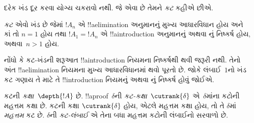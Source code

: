 \documentclass[../../../include/open-logic-section]{subfiles}
\begin{document}
દરેક ખંડ દૂર
કરવા યોગ્ય
ચકરાવો નથી.
જે એવા છે
તેમને \emph{કટ}
કહીએ છીએ.

\begin{defn}
\emph{કટ} એવો
ખંડ છે જેમાં
$!A_n$ એ
!!a{elimination}
અનુમાનનું મુખ્ય
આધારવિધાન હોય
અને કાં તો
$n=1$ હોય તથા
$!A_1 = !A_n$
એ !!a{introduction}
અનુમાનનું અથવા
\FalseInt{}નું
નિષ્કર્ષ હોય,
અથવા~$n>1$
હોય.
\end{defn}

નોંધો કે કટ-ખંડની
શરૂઆત !!a{introduction}
નિયમના નિષ્કર્ષથી
થવી જરૂરી નથી.
તેનો અંત
!!a{elimination}
નિયમના મુખ્ય
આધારવિધાનમાં
થવો પૂરતો છે.
જોકે લંબાઈ~$1$નો
ખંડ કટ ગણાય
તે માટે તે
!!{introduction}
નિયમનું અથવા
\FalseInt{}નું
નિષ્કર્ષ હોવું
જોઈએ.

\begin{defn}
કટની \emph{કક્ષા}~$\depth{!A}$
છે. !!a{proof}~$\delta$ની
\emph{કટ-કક્ષા}~$\cutrank{\delta}$
એ~$\delta$માંના
કટોની મહત્તમ
કક્ષા છે.
કટની કક્ષા
$\cutrank{\delta}$
હોય, એટલે
મહત્તમ કક્ષા
હોય, તો તે
$\delta$માં
\emph{મહત્તમ}
કટ છે.
$\delta$ની
\emph{કટ-લંબાઈ}
એ તેના બધા
મહત્તમ કટોની
લંબાઈનો સરવાળો
છે.
\end{defn}
\end{document}
